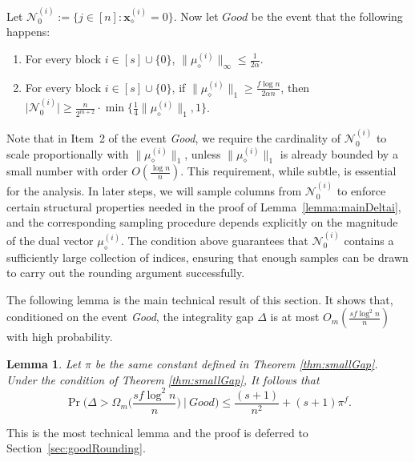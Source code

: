 \documentclass{article}
\newcommand{\xv}[0]{\mathbf{x}}
\newcommand{\normm}[1]{\big\lVert#1\big\rVert}
\newtheorem{lemma}{Lemma}[section]
\begin{document}
 
Let $\mathcal{N}_0^{(i)} := \{j \in [n] : \xv^{(i)}_{\diamond} = 0\}$. Now let $Good$ be the event that the following happens: 
\begin{enumerate}
    \item For every block $i \in [s] \cup \{0\}$, $\normm{\mu_{\diamond}^{(i)}}_{\infty} \leq \frac{1}{2\alpha}$.
    \item For every block $i \in [s] \cup \{0\}$, if 
    $\normm{\mu_{\diamond}^{(i)}}_1 \ge \frac{f \log n}{2 \alpha n}$, then  $\big|\mathcal{N}_0^{(i)}\big| \geq \frac{n}{2^{m+{2}}} \cdot \min\big\{ \frac{1}{4} \normm{\mu^{(i)}_\diamond}_1, 1\big\}$.
\end{enumerate}

Note that in Item~2 of the event \emph{Good}, we require the cardinality of
$\mathcal{N}_0^{(i)}$ to scale proportionally with
$\|\mu^{(i)}_\diamond\|_1$, unless $\|\mu^{(i)}_\diamond\|_1$ is already
bounded by a small number with order $O(\frac{\log n}{n})$. This requirement, while subtle, is essential for the
analysis. In later steps, we will sample columns from $\mathcal{N}_0^{(i)}$
to enforce certain structural properties needed in the proof of
Lemma~\ref{lemma:mainDeltai}, and the corresponding sampling procedure
depends explicitly on the magnitude of the dual vector
$\mu^{(i)}_\diamond$. The condition above guarantees that
$\mathcal{N}_0^{(i)}$ contains a sufficiently large collection of indices,
ensuring that enough samples can be drawn to carry out the rounding
argument successfully.

The following lemma is the main technical result of this section. It shows
that, conditioned on the event \emph{Good}, the integrality gap
$\Delta$ is at most $O_m\!\left(\frac{s f \log^2 n}{n}\right)$ with high
probability.


\begin{lemma} 
{Let $\pi$ be the same constant defined in Theorem \ref{thm:smallGap}}. Under the condition of Theorem \ref{thm:smallGap}, It follows that 
\label{lemma:condGap}
    $$\Pr\bigg(\Delta > \Omega_m\bigg(\frac{{sf}\log^2n}{n}\bigg) ~\bigg|~ Good\bigg) \le  {\frac{(s+1)}{n^2}+(s+1) \pi^f}.$$
\end{lemma}

This is the most technical lemma and the proof is deferred to Section~\ref{sec:goodRounding}. 
\end{document}
